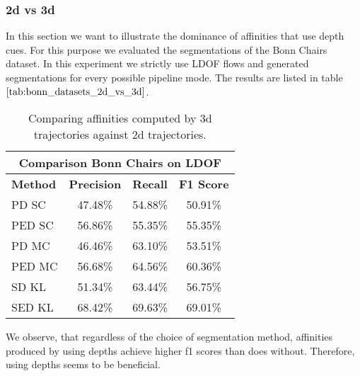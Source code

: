 \subsubsection{2d vs 3d}
In this section we want to illustrate the dominance of affinities that use depth cues. For this purpose we evaluated the segmentations of the Bonn Chairs dataset. In this experiment we strictly use LDOF flows and generated segmentations for every possible pipeline mode. The results are listed in table $\ref{tab:bonn_datasets_2d_vs_3d}$.
\begin{table}[H]
\centering
\begin{tabular}{|l|c|c|c|}
\hline
\multicolumn{4}{|c|}{Comparison Bonn Chairs on LDOF}                        \\ \hline
\textbf{Method} & \textbf{Precision} & \textbf{Recall} & \textbf{F1 Score}  \\ \hline
PD SC & 47.48\% & 54.88\% & 50.91\% \\ \hline
PED SC & 56.86\% & 55.35\% & 55.35\% \\ \hline
PD MC & 46.46\% & 63.10\% & 53.51\% \\ \hline
PED MC & 56.68\% & 64.56\% & 60.36\% \\ \hline              
SD KL & 51.34\% & 63.44\% & 56.75\% \\ \hline
SED KL & 68.42\% & 69.63\% & 69.01\% \\ \hline
\end{tabular}
\caption[2D vs. 3D: Bonn Datasets]{Comparing affinities computed by 3d trajectories against 2d trajectories.}
\label{tab:bonn_datasets_2d_vs_3d}
\end{table}
We observe, that regardless of the choice of segmentation method, affinities produced by using depths achieve higher f1 scores than does without. Therefore, using depths seems to be beneficial.

